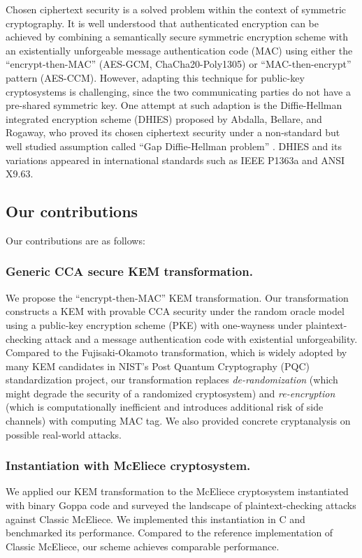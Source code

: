 \documentclass[runningheads]{llncs}
\begin{document}
Chosen ciphertext security is a solved problem within the context of symmetric cryptography. It is well understood that authenticated encryption can be achieved by combining a semantically secure symmetric encryption scheme with an existentially unforgeable message authentication code (MAC) using either the ``encrypt-then-MAC'' (AES-GCM, ChaCha20-Poly1305) or ``MAC-then-encrypt'' pattern (AES-CCM)\cite{DBLP:conf/asiacrypt/BellareN00,DBLP:conf/crypto/Krawczyk01}. However, adapting this technique for public-key cryptosystems is challenging, since the two communicating parties do not have a pre-shared symmetric key. One attempt at such adaption is the Diffie-Hellman integrated encryption scheme (DHIES) \cite{DBLP:journals/iacr/AbdallaBR99,DBLP:conf/ctrsa/AbdallaBR01} proposed by Abdalla, Bellare, and Rogaway, who proved its chosen ciphertext security under a non-standard but well studied assumption called ``Gap Diffie-Hellman problem'' \cite{DBLP:conf/pkc/OkamotoP01}. DHIES and its variations appeared in international standards such as IEEE P1363a\cite{P1363a-2004} and ANSI X9.63\cite{ansi-x9.63}.

\subsection{Our contributions}\label{sec:our-contributions}
Our contributions are as follows:

\subsubsection{Generic CCA secure KEM transformation.} We propose the ``encrypt-then-MAC'' KEM transformation. Our transformation constructs a KEM with provable CCA security under the random oracle model using a public-key encryption scheme (PKE) with one-wayness under plaintext-checking attack and a message authentication code with existential unforgeability. Compared to the Fujisaki-Okamoto transformation, which is widely adopted by many KEM candidates in NIST's Post Quantum Cryptography (PQC) standardization project, our transformation replaces \textit{de-randomization} (which might degrade the security of a randomized cryptosystem) and \textit{re-encryption} (which is computationally inefficient and introduces additional risk of side channels) with computing MAC tag. We also provided concrete cryptanalysis on possible real-world attacks.

\subsubsection{Instantiation with McEliece cryptosystem.} We applied our KEM transformation to the McEliece cryptosystem instantiated with binary Goppa code and surveyed the landscape of plaintext-checking attacks against Classic McEliece. We implemented this instantiation in C and benchmarked its performance. Compared to the reference implementation of Classic McEliece, our scheme achieves comparable performance.
\end{document}
